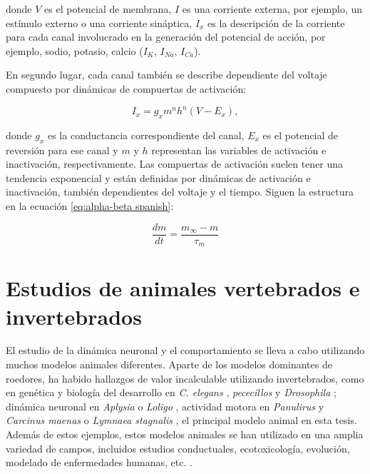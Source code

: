 donde \( V \) es el potencial de membrana, \( I \) es una corriente externa, por ejemplo, un estímulo externo o una corriente sináptica, \( I_{x} \) es la descripción de la corriente para cada canal involucrado en la generación del potencial de acción, por ejemplo, sodio, potasio, calcio (\( I_K \), \( I_{Na} \), \( I_{Ca} \)).

En segundo lugar, cada canal también se describe dependiente del voltaje compuesto por dinámicas de compuertas de activación:

\begin{equation}
I_x =  g_x m^n h^n (V - E_x),
\end{equation}

donde \( g_x \) es la conductancia correspondiente del canal, \( E_x \) es el potencial de reversión para ese canal y \( m \) y \( h \) representan las variables de activación e inactivación, respectivamente.
Las compuertas de activación suelen tener una tendencia exponencial y están definidas por dinámicas de activación e inactivación, también dependientes del voltaje y el tiempo. Siguen la estructura en la ecuación \ref{eq:alpha-beta spanish}:

\begin{equation}
\frac{dm}{dt} = \frac{m_{\infty} - m}{\tau_m}
\label{eq:alpha-beta spanish}
\end{equation}

\section{Estudios de animales vertebrados e invertebrados}
\label{c-intro-invertebrates spanish}
El estudio de la dinámica neuronal y el comportamiento se lleva a cabo utilizando muchos modelos animales diferentes. Aparte de los modelos dominantes de roedores, ha habido hallazgos de valor incalculable utilizando invertebrados, como en genética y biología del desarrollo en \textit{C. elegans} \parencite{brenner_genetics_1974}, \textit{pececillos} \parencite{streisinger_production_1981} y \textit{Drosophila} \parencite{nusslein-volhard_mutations_1980}; dinámica neuronal en \textit{Aplysia} \parencite{wachtel_direct_1967} o \textit{Loligo} \parencite{hodgkin_quantitative_1952}, actividad motora en \textit{Panulirus} \parencite{selverston_stomatogastric_1976} y \textit{Carcinus maenas} \parencite{eisen_mechanisms_1982} o \textit{Lymnaea stagnalis} \parencite{benjamin_centraldecastro}, el principal modelo animal en esta tesis. Además de estos ejemplos, estos modelos animales se han utilizado en una amplia variedad de campos, incluidos estudios conductuales, ecotoxicología, evolución, modelado de enfermedades humanas, etc. \parencite{romanova_animal_2018}.

